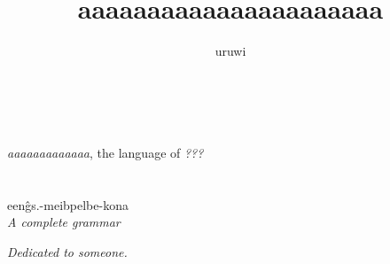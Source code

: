 \documentclass{book}
\title{aaaaaaaaaaaaaaaaaaaaaa}
\author{uruwi}
\newcommand{\lname}{aaaaaaaaaaaaa}
\begin{document}
\pagecolor{LightSkyBlue2!25}

\begin{titlepage}
  \makeatletter
  \begin{center}
    {\color{DeepSkyBlue3} \hprule \vspace{1.5ex} \\}
    {\Huge \sffamily \textcolor{SteelBlue3}{\@title} \\}
    {\large \textit{\lname}, the language of \textit{???} \\}
    {\color{DeepSkyBlue3} \hprule \vspace{1.5ex} \\}
    \vspace{1.5cm}
    {\Large\bfseries \@author}\\[5pt]
    \vspace{2cm}
    \textnormal{een\^gs.-meibpelbe-kona} \\[5pt]
    \emph{A complete grammar}\\[2cm]
    \vfill
    \vfill
    {\@date}
  \end{center}
  \makeatother
\end{titlepage}

\pagecolor{LightSkyBlue2!15}

\begin{center}
    \textit{Dedicated to someone.}
\end{center}
\end{document}
